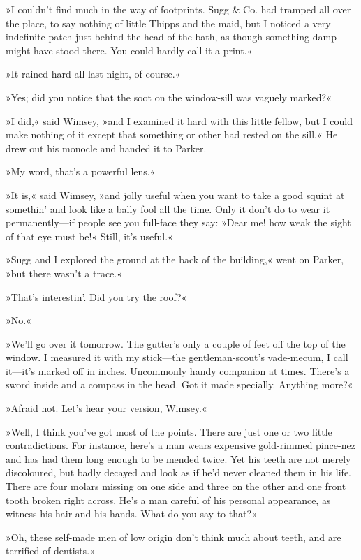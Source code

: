 »I couldn't find much in the way of footprints. Sugg \& Co. had tramped all over the place, to say nothing of little Thipps and the maid, but I noticed a very indefinite patch just behind the head of the bath, as though something damp might have stood there. You could hardly call it a print.«

»It rained hard all last night, of course.«

»Yes; did you notice that the soot on the window-sill was vaguely marked?«

»I did,« said Wimsey, »and I examined it hard with this little fellow, but I could make nothing of it except that something or other had rested on the sill.« He drew out his monocle and handed it to Parker.

»My word, that's a powerful lens.«

»It is,« said Wimsey, »and jolly useful when you want to take a good squint at somethin' and look like a bally fool all the time. Only it don't do to wear it permanently\allowbreak---\allowbreak if people see you full-face they say: »Dear me! how weak the sight of that eye must be!« Still, it's useful.«

»Sugg and I explored the ground at the back of the building,« went on Parker, »but there wasn't a trace.«

»That's interestin'. Did you try the roof?«

»No.«

»We'll go over it tomorrow. The gutter's only a couple of feet off the top of the window. I measured it with my stick\allowbreak---\allowbreak the gentleman-scout's vade-mecum, I call it\allowbreak---\allowbreak it's marked off in inches. Uncommonly handy companion at times. There's a sword inside and a compass in the head. Got it made specially. Anything more?«

»Afraid not. Let's hear your version, Wimsey.«

»Well, I think you've got most of the points. There are just one or two little contradictions. For instance, here's a man wears expensive gold-rimmed pince-nez and has had them long enough to be mended twice. Yet his teeth are not merely discoloured, but badly decayed and look as if he'd never cleaned them in his life. There are four molars missing on one side and three on the other and one front tooth broken right across. He's a man careful of his personal appearance, as witness his hair and his hands. What do you say to that?«

»Oh, these self-made men of low origin don't think much about teeth, and are terrified of dentists.«

